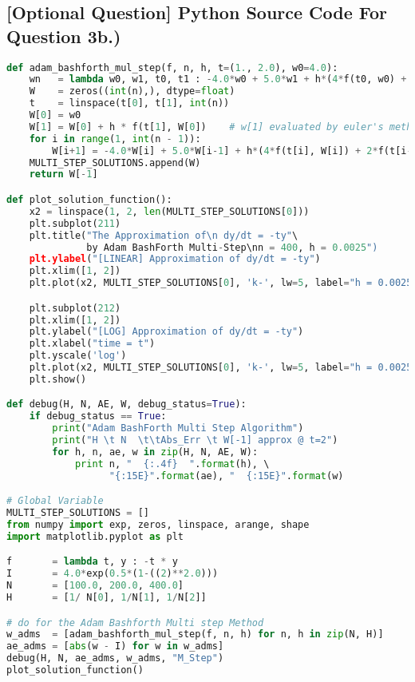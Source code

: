 \documentclass{article}
\begin{document}
\subsection*{[Optional Question] Python Source Code For Question 3b.) }
\begin{lstlisting}[language=Python]
def adam_bashforth_mul_step(f, n, h, t=(1., 2.0), w0=4.0):
    wn   = lambda w0, w1, t0, t1 : -4.0*w0 + 5.0*w1 + h*(4*f(t0, w0) + 2*f(t1, w1))
    W    = zeros((int(n),), dtype=float)
    t    = linspace(t[0], t[1], int(n))
    W[0] = w0
    W[1] = W[0] + h * f(t[1], W[0])    # w[1] evaluated by euler's method
    for i in range(1, int(n - 1)):
        W[i+1] = -4.0*W[i] + 5.0*W[i-1] + h*(4*f(t[i], W[i]) + 2*f(t[i-1], W[i-1]))
    MULTI_STEP_SOLUTIONS.append(W)
    return W[-1]

def plot_solution_function():
    x2 = linspace(1, 2, len(MULTI_STEP_SOLUTIONS[0]))
    plt.subplot(211)
    plt.title("The Approximation of\n dy/dt = -ty"\ 
              by Adam BashForth Multi-Step\nn = 400, h = 0.0025")
    plt.ylabel("[LINEAR] Approximation of dy/dt = -ty")
    plt.xlim([1, 2])
    plt.plot(x2, MULTI_STEP_SOLUTIONS[0], 'k-', lw=5, label="h = 0.0025")

    plt.subplot(212)
    plt.xlim([1, 2])
    plt.ylabel("[LOG] Approximation of dy/dt = -ty")
    plt.xlabel("time = t")
    plt.yscale('log')
    plt.plot(x2, MULTI_STEP_SOLUTIONS[0], 'k-', lw=5, label="h = 0.0025")
    plt.show()

def debug(H, N, AE, W, debug_status=True):
    if debug_status == True:
        print("Adam BashForth Multi Step Algorithm")
        print("H \t N  \t\tAbs_Err \t W[-1] approx @ t=2")
        for h, n, ae, w in zip(H, N, AE, W):
            print n, "  {:.4f}  ".format(h), \ 
                  "{:15E}".format(ae), "  {:15E}".format(w)

# Global Variable
MULTI_STEP_SOLUTIONS = []
from numpy import exp, zeros, linspace, arange, shape
import matplotlib.pyplot as plt

f       = lambda t, y : -t * y
I       = 4.0*exp(0.5*(1-((2)**2.0)))
N       = [100.0, 200.0, 400.0]
H       = [1/ N[0], 1/N[1], 1/N[2]]

# do for the Adam Bashforth Multi step Method
w_adms  = [adam_bashforth_mul_step(f, n, h) for n, h in zip(N, H)]
ae_adms = [abs(w - I) for w in w_adms]
debug(H, N, ae_adms, w_adms, "M_Step")
plot_solution_function()
\end{lstlisting}
\end{document}
